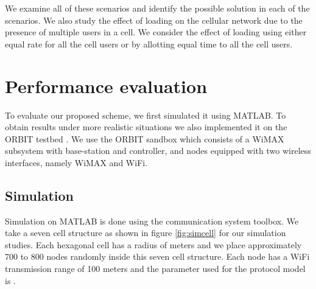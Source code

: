 \documentclass{sig-alternate-10pt}
\begin{document}
We examine  all of these scenarios and identify the  possible solution in each of the scenarios.
We also study  the effect of loading on the cellular network due to the presence of multiple users in a cell. We consider the effect of loading using either equal rate for all the cell users or by allotting equal time to all the cell users. 




\section{Performance evaluation}
To evaluate our proposed scheme,  we first  simulated it using MATLAB. To  obtain results under more realistic situations we also implemented it on the ORBIT testbed \cite{Raychaudhuri05orbit}. We use the ORBIT sandbox which consists of a WiMAX subsystem with base-station and controller, and nodes equipped with two wireless interfaces, namely WiMAX and WiFi. 

\subsection{Simulation}
Simulation on MATLAB is done using the communication system toolbox. We take a seven cell structure as shown in figure \ref{fig:simcell} for our simulation studies. Each hexagonal cell has a radius of  meters and we place approximately 700 to 800 nodes randomly inside this seven cell structure. Each node has a WiFi transmission range of 100 meters and the parameter  used for the protocol model  is  .
\end{document}
